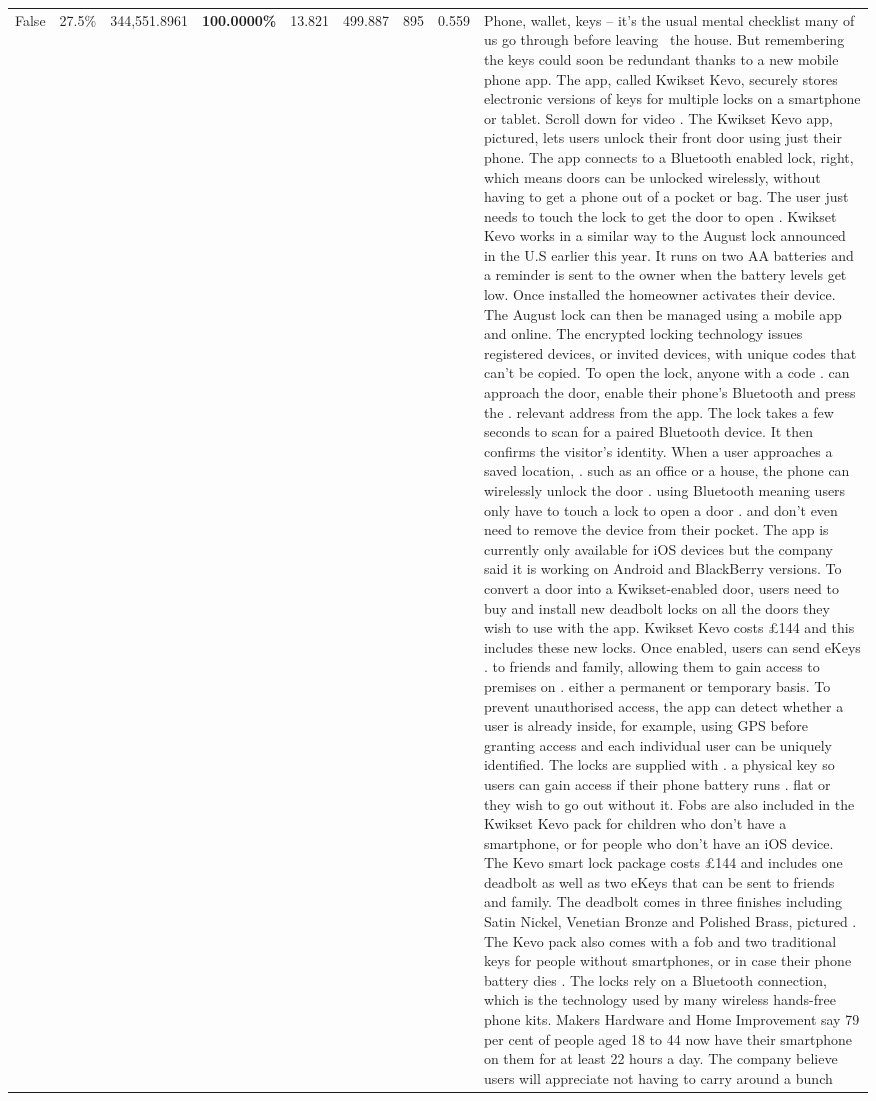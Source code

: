 \begin{table}[H]
\begin{tabular}{lllrlllll}
False & 27.5\% & 344,551.8961 & \bfseries \color{red} 100.0000\% & 13.821 & 499.887 & 895 & 0.559 & Phone, wallet, keys – it’s the usual mental checklist many of us go through before leaving  the house. But remembering the keys could soon be redundant thanks to a new mobile phone app. The app, called Kwikset Kevo, securely stores electronic versions of keys for multiple locks on a smartphone or tablet. Scroll down for video . The Kwikset Kevo app, pictured, lets users unlock their front door using just their phone. The app connects to a Bluetooth enabled lock, right, which means doors can be unlocked wirelessly, without having to get a phone out of a pocket or bag. The user just needs to touch the lock to get the door to open . Kwikset Kevo works in a similar way to the August lock announced in the U.S earlier this year. It runs on two AA batteries and a reminder is sent to the owner when the battery levels get low. Once installed the homeowner activates their device. The August lock can then be managed using a mobile app and online. The encrypted locking technology issues registered devices, or invited devices, with unique codes that can't be copied. To open the lock, anyone with a code . can approach the door, enable their phone's Bluetooth and press the . relevant address from the app. The lock takes a few seconds to scan for a paired Bluetooth device. It then confirms the visitor's identity. When a user approaches a saved location, . such as an office or a house, the phone can wirelessly unlock the door . using Bluetooth meaning users only have to touch a lock to open a door . and don't even need to remove the device from their pocket. The app is currently only available for iOS devices but the company said it is working on Android and BlackBerry versions. To convert a door into a Kwikset-enabled door, users need to buy and install new deadbolt locks on all the doors they wish to use with the app. Kwikset Kevo costs £144 and this includes these new locks. Once enabled, users can send eKeys . to friends and family, allowing them to gain access to premises on . either a permanent or temporary basis. To prevent unauthorised access, the app can detect whether a user is already inside, for example, using GPS before granting access and each individual user can be uniquely identified. The locks are supplied with . a physical key so users can gain access if their phone battery runs . flat or they wish to go out without it. Fobs are also included in the Kwikset Kevo pack for children who don't have a smartphone, or for people who don't have an iOS device. The Kevo smart lock package costs £144 and includes one deadbolt as well as two eKeys that can be sent to friends and family. The deadbolt comes in three finishes including Satin Nickel, Venetian Bronze and Polished Brass, pictured . The Kevo pack also comes with a fob and two traditional keys for people without smartphones, or in case their phone battery dies . The locks rely on a Bluetooth connection, which is the technology used by many wireless hands-free phone kits. Makers Hardware and Home Improvement say 79 per cent of people aged 18 to 44 now have their smartphone on them for at least 22 hours a day. The company believe users will appreciate not having to carry around a bunch 
\end{tabular}
\end{table}
